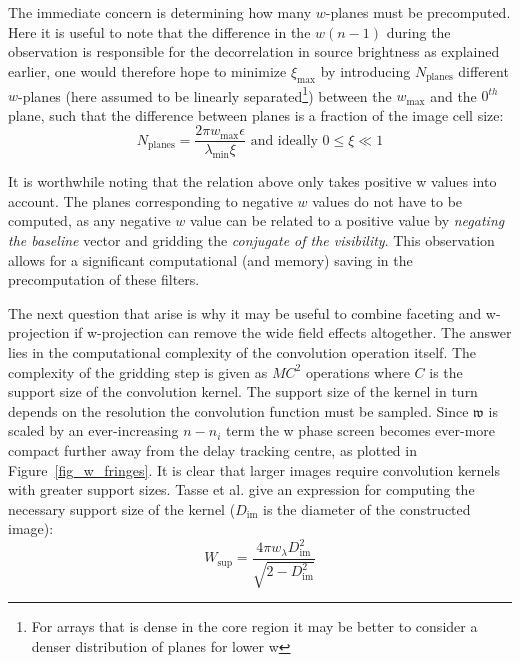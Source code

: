 The immediate concern is determining how many $w$-planes must be precomputed. Here it is useful to note that the difference in the $w(n-1)$ during the
observation is responsible for the decorrelation in source brightness as explained earlier, one would therefore hope to minimize $\xi_{\text{max}}$ by introducing
$N_{\text{planes}}$ different $w$-planes (here assumed to be linearly separated\footnote{For arrays that is dense in the core region it may be better to consider
a denser distribution of planes for lower w}) between the $w_{\text{max}}$ and the $0^{th}$ plane, such that the difference between planes is a fraction of the image cell size:
\begin{equation}
 N_{\text{planes}}=\frac{2{\pi}w_{\text{max}}\epsilon}{{\lambda_{\text{min}}}{\xi}} \text{ and ideally } 0{\leq\xi\ll}1
\end{equation}

It is worthwhile noting that the relation above only takes positive w values into account. The planes corresponding to negative $w$ values do not have to be computed,
as any negative $w$ value can be related to a positive value by \emph{negating the baseline} vector and gridding the \emph{conjugate of the visibility}. This observation allows
for a significant computational (and memory) saving in the precomputation of these filters.

The next question that arise is why it may be useful to combine faceting and w-projection if w-projection can remove the wide field effects altogether. The answer
lies in the computational complexity of the convolution operation itself. The complexity of the gridding step is given as $MC^2$ operations where $C$ is the support
size of the convolution kernel. The support size of the kernel in turn depends on the resolution the convolution function must be sampled. Since
$\mathfrak{w}$ is scaled by an ever-increasing $n-n_i$ term the w phase screen becomes ever-more compact further away from the delay tracking centre, as plotted 
in Figure~\ref{fig_w_fringes}. It is clear that larger images require convolution kernels with greater support sizes. Tasse et al. \cite{tasse2013applying} give 
an expression for computing the necessary support size of the kernel ($D_{\text{im}}$ is the diameter of the constructed image):
\begin{equation}
W_{\text{sup}}=\frac{4{\pi}w_{\lambda}D^2_{\text{im}}}{\sqrt{2-D^2_{\text{im}}}}
\end{equation}

